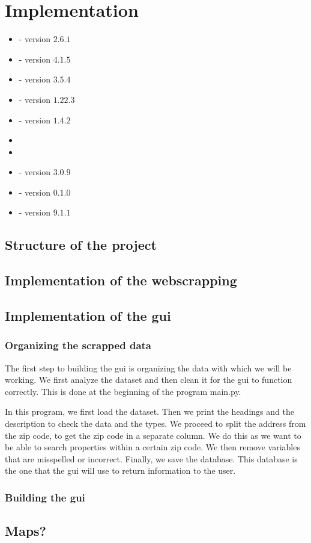 \documentclass[main]{subfiles}
\begin{document}
\section{Implementation}
\begin{itemize}
    \item \pkg[Scrapy] -  version $2.6.1$
    \item \pkg[Selenium] - version $4.1.5$
    \item {} - version $3.5.4$
    \item \pkg[Numpy] -  version $1.22.3$
    \item \pkg[Pandas]  - version $1.4.2$
    \item \pkg[Time]
    \item \pkg[Datetime]
    \item \pkg[Openpyxl] - version $3.0.9$
    \item \pkg[Tk (tkinter)] - version $0.1.0$
    \item \pkg[Pillow] - version $9.1.1$
\end{itemize}

\subsection{Structure of the project}

\subsection{Implementation of the webscrapping}

\subsection{Implementation of the \ac{gui}}

\subsubsection{Organizing the scrapped data}
The first step to building the \ac{gui} is organizing the data with which we will be working.
We first analyze the dataset and then clean it for the \ac{gui} to function correctly.
This is done at the beginning of the program main.py.

In this program, we first load the dataset. 
Then we print the headings and the description to check the data and the types.
We proceed to split the address from the zip code, to get the zip code in a separate column. 
We do this as we want to be able to search properties within a certain zip code. 
We then remove variables that are misspelled or incorrect. 
Finally, we save the database. This database is the one that the \ac{gui} will use to return information to the user.

\subsubsection{Building the \ac{gui}}

\subsection{Maps?}
\end{document}
